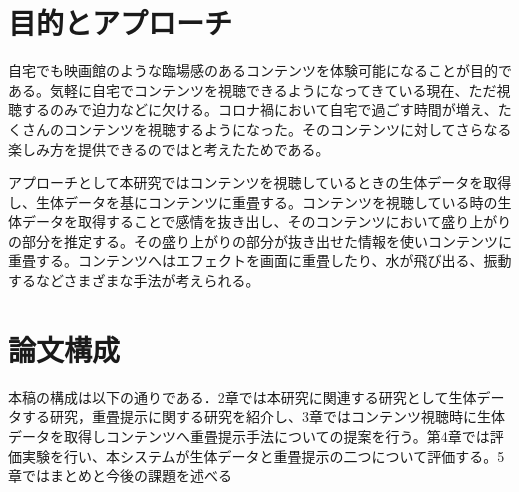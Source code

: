 \section{目的とアプローチ}
自宅でも映画館のような臨場感のあるコンテンツを体験可能になることが目的である。気軽に自宅でコンテンツを視聴できるようになってきている現在、ただ視聴するのみで迫力などに欠ける。コロナ禍において自宅で過ごす時間が増え、たくさんのコンテンツを視聴するようになった。そのコンテンツに対してさらなる楽しみ方を提供できるのではと考えたためである。

アプローチとして本研究ではコンテンツを視聴しているときの生体データを取得し、生体データを基にコンテンツに重畳する。コンテンツを視聴している時の生体データを取得することで感情を抜き出し、そのコンテンツにおいて盛り上がりの部分を推定する。その盛り上がりの部分が抜き出せた情報を使いコンテンツに重畳する。コンテンツへはエフェクトを画面に重畳したり、水が飛び出る、振動するなどさまざまな手法が考えられる。

\label{sec:example}


\section{論文構成}
本稿の構成は以下の通りである．2章では本研究に関連する研究として生体データする研究，重畳提示に関する研究を紹介し、3章ではコンテンツ視聴時に生体データを取得しコンテンツへ重畳提示手法についての提案を行う。第4章では評価実験を行い、本システムが生体データと重畳提示の二つについて評価する。5章ではまとめと今後の課題を述べる

